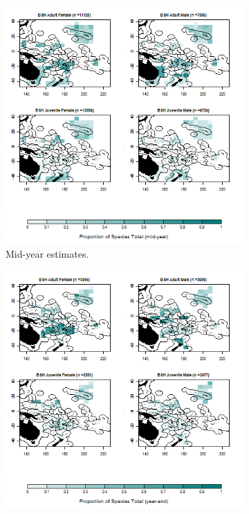 \documentclass[12pt]{SCreport}
\begin{document}
\begin{landscape}
\begin{figure}
\centering
   \begin{subfigure}[b]{0.6\textwidth}
       \includegraphics[width=\textwidth]{../GRAPHICS/Defined/BI_20_Map_maturity_sex_BSH_MY}
       \caption{Mid-year estimates.}
       \label{fig:test1}
   \end{subfigure}
   \begin{subfigure}[b]{0.6\textwidth}
       \includegraphics[width=\textwidth]{../GRAPHICS/Defined/BI_19_Map_maturity_sex_BSH}

\end{subfigure}
\end{figure}
\end{landscape}
\end{document}
